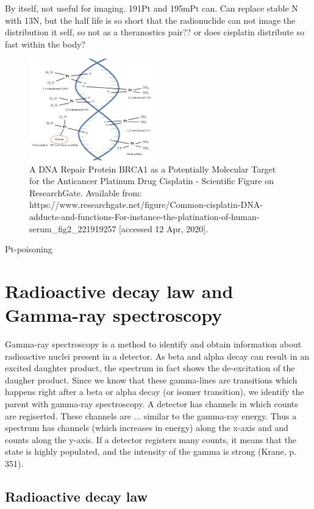 \documentclass[a4paper,11pt,twoside]{book}
\begin{document}
By itself, not useful for imaging. 191Pt and 195mPt can. Can replace stable N with 13N, but the half life is so short that the radionuclide can not image the distribution it self, so not as a theranostics pair?? or does cisplatin distribute so fast within the body? 



\begin{figure}
    \centering
    \includegraphics[width=0.5\textwidth]{Theory/cisplatin_DNA.png}
    \caption{A DNA Repair Protein BRCA1 as a Potentially Molecular Target for the Anticancer Platinum Drug Cisplatin - Scientific Figure on ResearchGate. Available from: https://www.researchgate.net/figure/Common-cisplatin-DNA-adducts-and-functions-For-instance-the-platination-of-human-serum_fig2_221919257 [accessed 12 Apr, 2020]. }
    \label{fig:cisplatin_DNA}
\end{figure}
Pt-poisoning 


\section{Radioactive decay law and Gamma-ray spectroscopy}
Gamma-ray spectroscopy is a method to identify and obtain information about radioactive nuclei present in a detector. As beta and alpha decay can result in an excited daughter product, the spectrum in fact shows the de-excitation of the daugher product. Since we know that these gamma-lines are transitions which happens right after a beta or alpha decay (or isomer transition), we identify the parent with gamma-ray spectroscopy. A detector has channels in which counts are regiserted. These channels are ... similar to the gamma-ray energy. Thus a spectrum has channels (which increases in energy) along the x-axis and and counts along the y-axis. If a detector registers many counts, it means that the state is highly populated, and the intensity of the gamma is strong (Krane, p. 351). 

\subsection{Radioactive decay law}
\end{document}
